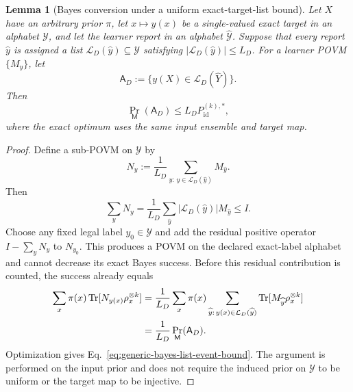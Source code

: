 \documentclass[11pt]{article}
\newcommand{\Tr}{\operatorname{Tr}}
\newcommand{\1}{\mathbf 1}
\theoremstyle{plain}
\newtheorem{lemma}[theorem]{Lemma}
\theoremstyle{definition}
\theoremstyle{remark}
\begin{document}
\begin{lemma}[Bayes conversion under a uniform exact-target-list bound]
\label{lem:generic-bayes-bounded-list-conversion}
Let $X$ have an arbitrary prior $\pi$, let $x\mapsto y(x)$ be a single-valued
exact target in an alphabet $\mathcal Y$, and let the learner report in an
alphabet $\widehat{\mathcal Y}$.  Suppose that every report $\widehat y$ is
assigned a list $\mathcal L_D(\widehat y)\subseteq\mathcal Y$ satisfying
$|\mathcal L_D(\widehat y)|\le L_D$.  For a learner POVM
$\{M_{\widehat y}\}$, let
\begin{equation}
 \mathsf A_D:=\{y(X)\in\mathcal L_D(\widehat Y)\}.
 \label{eq:generic-bayes-list-event}
\end{equation}
Then
\begin{equation}
 \Pr_{\mathsf M}(\mathsf A_D)\le L_D P_{\mathrm{id}}^{(k),*},
 \label{eq:generic-bayes-list-event-bound}
\end{equation}
where the exact optimum uses the same input ensemble and target map.
\end{lemma}
\begin{proof}
Define a sub-POVM on $\mathcal Y$ by
\begin{equation}
 N_y:=\frac1{L_D}\sum_{\widehat y:\,
 y\in\mathcal L_D(\widehat y)}M_{\widehat y}.
 \label{eq:generic-bayes-list-subpovm}
\end{equation}
Then
\begin{equation}
 \sum_yN_y
 =\frac1{L_D}\sum_{\widehat y}
 |\mathcal L_D(\widehat y)|M_{\widehat y}\le I.
 \label{eq:generic-bayes-list-subnormalization}
\end{equation}
Choose any fixed legal label $y_0\in\mathcal Y$ and add the residual
positive operator $I-\sum_yN_y$ to $N_{y_0}$.  This produces a POVM on the
declared exact-label alphabet and cannot decrease its exact Bayes success.
Before this residual contribution is counted, the success already equals
\begin{align}
 \sum_x\pi(x)\Tr[N_{y(x)}\rho_x^{\otimes k}]
 &=\frac1{L_D}\sum_x\pi(x)
 \sum_{\widehat y:\,y(x)\in\mathcal L_D(\widehat y)}
 \Tr[M_{\widehat y}\rho_x^{\otimes k}]\notag\\
 &=\frac1{L_D}\Pr_{\mathsf M}(\mathsf A_D).
 \label{eq:generic-bayes-list-success}
\end{align}
Optimization gives Eq.~\eqref{eq:generic-bayes-list-event-bound}.  The argument
is performed on the input prior and does not require the induced prior on
$\mathcal Y$ to be uniform or the target map to be injective.
\end{proof}
\end{document}
